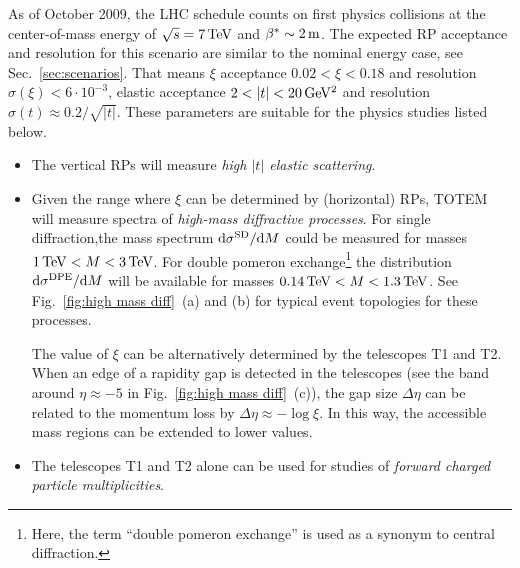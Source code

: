 \documentclass{cimento}
\def\be{\beta}
\def\De{\Delta}
\def\si{\sigma}
\def\un#1{\,{\rm #1}}
\def\d{{\rm d}}
\begin{document}
As of October 2009, the LHC schedule counts on first physics collisions at the center-of-mass energy of $\sqrt{s} = 7\un{TeV}$ and $\be^*\sim2\un{m}$. The expected RP acceptance and resolution for this scenario are similar to the nominal energy case, see Sec.~\ref{sec:scenarios}. That means $\xi$ acceptance $0.02 < \xi < 0.18$ and resolution $\si(\xi) < 6\cdot10^{-3}$, elastic acceptance $2 < |t| < 20\un{GeV^2}$ and resolution $\si(t)\approx 0.2/\sqrt{|t|}$. These parameters are suitable for the physics studies listed below.
\begin{itemize}
\item The vertical RPs will measure {\em high $|t|$ elastic scattering}.

\item Given the range where $\xi$ can be determined by (horizontal) RPs, TOTEM will measure spectra of {\em high-mass diffractive processes}. For single diffraction,the mass spectrum $\d\si^{\rm SD}/\d M$ could be measured for masses $1\un{TeV} < M < 3\un{TeV}$. 
For double pomeron exchange\footnote{Here, the term ``double pomeron exchange'' is used as a synonym to central diffraction.}
the distribution $\d\si^{\rm DPE}/\d M$ will be available for masses $0.14\un{TeV} < M < 1.3\un{TeV}$.
See Fig.~\ref{fig:high mass diff}~(a) and (b) for typical event topologies for these processes.

The value of $\xi$ can be alternatively determined by the telescopes T1 and T2. When an edge of a rapidity gap is detected in the telescopes (see the band around $\eta\approx -5$ in Fig.~\ref{fig:high mass diff}~(c)), the gap size $\De\eta$ can be related to the momentum loss by $\De\eta\approx - \log\xi$. In this way, the accessible mass regions can be extended to lower values.

\item  The telescopes T1 and T2 alone can be used for studies of {\em forward charged particle multiplicities}.
\end{itemize}




\iffalse
\begin{figure}[htb]
\hbox to\hsize{\hss
	\texttt{[image: ../fig/mc\_charged\_multiplicity]}\hss
}%
\caption{Large uncertainties in Monte Carlo predictions of forward charged multiplicity.}%
\label{fig:multiplicity}%
\end{figure}
\fi
\end{document}
